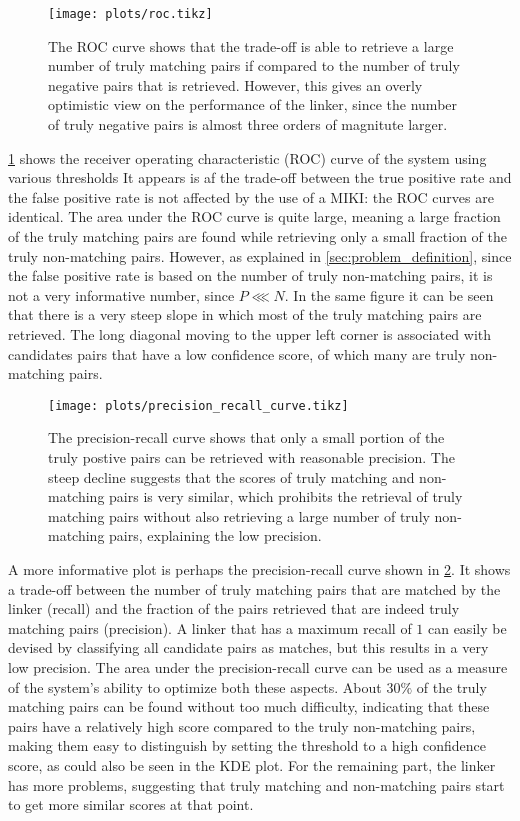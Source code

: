 \begin{figure}
    \centering
    \texttt{[image: plots/roc.tikz]}
    \caption{The ROC curve shows that the trade-off is able to retrieve a large number of truly matching pairs if compared to the number of truly negative pairs that is retrieved. However, this gives an overly optimistic view on the performance of the linker, since the number of truly negative pairs is almost three orders of magnitute larger.}
    \label{fig:roc}
\end{figure}

\cref{fig:roc} shows the receiver operating characteristic (ROC) curve of the system using various thresholds
It appears is af the trade-off between the true positive rate and the false positive rate is not affected by the use of a MIKI: the ROC curves are identical.
The area under the ROC curve is quite large, meaning a large fraction of the truly matching pairs are found while retrieving only a small fraction of the truly non-matching pairs.
However, as explained in \cref{sec:problem_definition}, since the false positive rate is based on the number of truly non-matching pairs, it is not a very informative number, since $P \lll N$.
In the same figure it can be seen that there is a very steep slope in which most of the truly matching pairs are retrieved.
The long diagonal moving to the upper left corner is associated with candidates pairs that have a low confidence score, of which many are truly non-matching pairs.

\begin{figure}
    \centering
    \texttt{[image: plots/precision\_recall\_curve.tikz]}
   \caption{The precision-recall curve shows that only a small portion of the truly postive pairs can be retrieved with reasonable precision. The steep decline suggests that the scores of truly matching and non-matching pairs is very similar, which prohibits the retrieval of truly matching pairs without also retrieving a large number of truly non-matching pairs, explaining the low precision.}
    \label{fig:precision_recall}
\end{figure}

A more informative plot is perhaps the precision-recall curve shown in \cref{fig:precision_recall}.
It shows a trade-off between the number of truly matching pairs that are matched by the linker (recall) and the fraction of the pairs retrieved that are indeed truly matching pairs (precision).
A linker that has a maximum recall of $1$ can easily be devised by classifying all candidate pairs as matches, but this results in a very low precision.
The area under the precision-recall curve can be used as a measure of the system's ability to optimize both these aspects.
About $30\%$ of the truly matching pairs can be found without too much difficulty, indicating that these pairs have a relatively high score compared to the truly non-matching pairs, making them easy to distinguish by setting the threshold to a high confidence score, as could also be seen in the KDE plot.
For the remaining part, the linker has more problems, suggesting that truly matching and non-matching pairs start to get more similar scores at that point.

